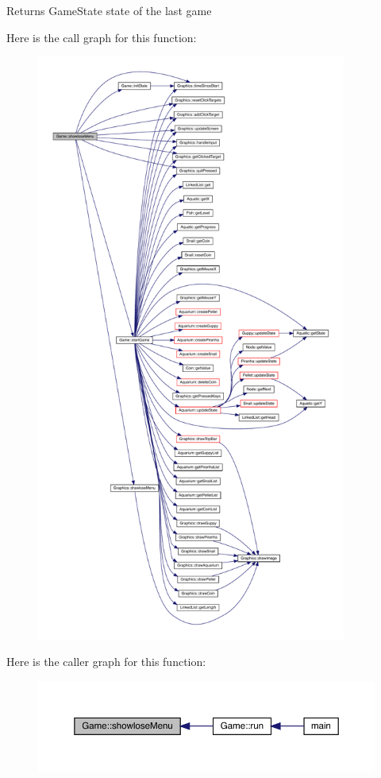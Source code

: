 \begin{DoxyReturn}{Returns}
Game\+State state of the last game 
\end{DoxyReturn}
Here is the call graph for this function\+:\nopagebreak
\begin{figure}[H]
\begin{center}
\leavevmode
\includegraphics[height=550pt]{class_game_a6b065cbc7a8a804ce90b5e5463b8ebfd_cgraph}
\end{center}
\end{figure}
Here is the caller graph for this function\+:
\nopagebreak
\begin{figure}[H]
\begin{center}
\leavevmode
\includegraphics[width=350pt]{class_game_a6b065cbc7a8a804ce90b5e5463b8ebfd_icgraph}
\end{center}
\end{figure}
\mbox{\label{class_game_a1bbeccf533a8d660ef5858c1f0cd08b6}} 

